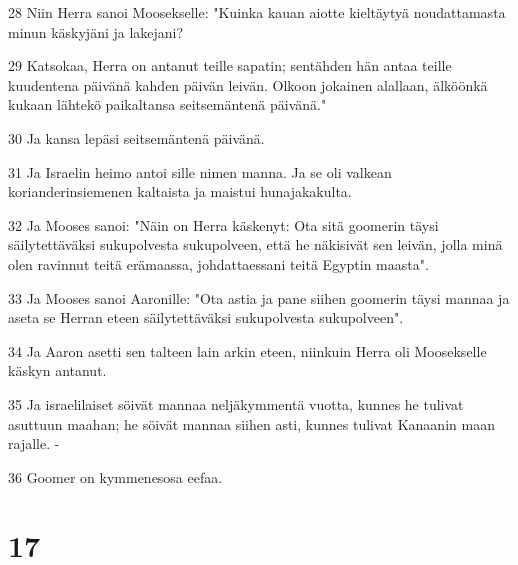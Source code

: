 \par 28 Niin Herra sanoi Moosekselle: "Kuinka kauan aiotte kieltäytyä noudattamasta minun käskyjäni ja lakejani?
\par 29 Katsokaa, Herra on antanut teille sapatin; sentähden hän antaa teille kuudentena päivänä kahden päivän leivän. Olkoon jokainen alallaan, älköönkä kukaan lähtekö paikaltansa seitsemäntenä päivänä."
\par 30 Ja kansa lepäsi seitsemäntenä päivänä.
\par 31 Ja Israelin heimo antoi sille nimen manna. Ja se oli valkean korianderinsiemenen kaltaista ja maistui hunajakakulta.
\par 32 Ja Mooses sanoi: "Näin on Herra käskenyt: Ota sitä goomerin täysi säilytettäväksi sukupolvesta sukupolveen, että he näkisivät sen leivän, jolla minä olen ravinnut teitä erämaassa, johdattaessani teitä Egyptin maasta".
\par 33 Ja Mooses sanoi Aaronille: "Ota astia ja pane siihen goomerin täysi mannaa ja aseta se Herran eteen säilytettäväksi sukupolvesta sukupolveen".
\par 34 Ja Aaron asetti sen talteen lain arkin eteen, niinkuin Herra oli Moosekselle käskyn antanut.
\par 35 Ja israelilaiset söivät mannaa neljäkymmentä vuotta, kunnes he tulivat asuttuun maahan; he söivät mannaa siihen asti, kunnes tulivat Kanaanin maan rajalle. -
\par 36 Goomer on kymmenesosa eefaa.

\chapter{17}

